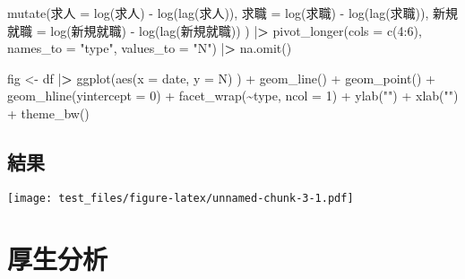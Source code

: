 \documentclass[
]{book}
\newenvironment{Shaded}{\begin{snugshade}}{\end{snugshade}}
\newcommand{\AttributeTok}[1]{\textcolor[rgb]{0.77,0.63,0.00}{#1}}
\newcommand{\DecValTok}[1]{\textcolor[rgb]{0.00,0.00,0.81}{#1}}
\newcommand{\ErrorTok}[1]{\textcolor[rgb]{0.64,0.00,0.00}{\textbf{#1}}}
\newcommand{\FunctionTok}[1]{\textcolor[rgb]{0.00,0.00,0.00}{#1}}
\newcommand{\NormalTok}[1]{#1}
\newcommand{\OtherTok}[1]{\textcolor[rgb]{0.56,0.35,0.01}{#1}}
\newcommand{\SpecialCharTok}[1]{\textcolor[rgb]{0.00,0.00,0.00}{#1}}
\newcommand{\StringTok}[1]{\textcolor[rgb]{0.31,0.60,0.02}{#1}}
\begin{document}
\begin{Shaded}
\begin{Highlighting}[]
  \FunctionTok{mutate}\NormalTok{(求人 }\OtherTok{=} \FunctionTok{log}\NormalTok{(求人) }\SpecialCharTok{{-}} \FunctionTok{log}\NormalTok{(}\FunctionTok{lag}\NormalTok{(求人)),}
\NormalTok{           求職 }\OtherTok{=} \FunctionTok{log}\NormalTok{(求職) }\SpecialCharTok{{-}} \FunctionTok{log}\NormalTok{(}\FunctionTok{lag}\NormalTok{(求職)),}
\NormalTok{           新規就職 }\OtherTok{=} \FunctionTok{log}\NormalTok{(新規就職) }\SpecialCharTok{{-}} \FunctionTok{log}\NormalTok{(}\FunctionTok{lag}\NormalTok{(新規就職))}
\NormalTok{           ) }\SpecialCharTok{|}\ErrorTok{\textgreater{}} 
  \FunctionTok{pivot\_longer}\NormalTok{(}\AttributeTok{cols =} \FunctionTok{c}\NormalTok{(}\DecValTok{4}\SpecialCharTok{:}\DecValTok{6}\NormalTok{),}
               \AttributeTok{names\_to =} \StringTok{"type"}\NormalTok{,}
               \AttributeTok{values\_to =} \StringTok{"N"}\NormalTok{) }\SpecialCharTok{|}\ErrorTok{\textgreater{}} 
  \FunctionTok{na.omit}\NormalTok{()}

\NormalTok{fig }\OtherTok{\textless{}{-}}
\NormalTok{  df }\SpecialCharTok{|}\ErrorTok{\textgreater{}} 
  \FunctionTok{ggplot}\NormalTok{(}\FunctionTok{aes}\NormalTok{(}\AttributeTok{x =}\NormalTok{ date,}
             \AttributeTok{y =}\NormalTok{ N)}
\NormalTok{         ) }\SpecialCharTok{+}
  \FunctionTok{geom\_line}\NormalTok{() }\SpecialCharTok{+}
  \FunctionTok{geom\_point}\NormalTok{() }\SpecialCharTok{+}
  \FunctionTok{geom\_hline}\NormalTok{(}\AttributeTok{yintercept =} \DecValTok{0}\NormalTok{) }\SpecialCharTok{+}
  \FunctionTok{facet\_wrap}\NormalTok{(}\SpecialCharTok{\textasciitilde{}}\NormalTok{type,}
             \AttributeTok{ncol =} \DecValTok{1}\NormalTok{) }\SpecialCharTok{+}
  \FunctionTok{ylab}\NormalTok{(}\StringTok{""}\NormalTok{) }\SpecialCharTok{+}
  \FunctionTok{xlab}\NormalTok{(}\StringTok{""}\NormalTok{) }\SpecialCharTok{+}
  \FunctionTok{theme\_bw}\NormalTok{()}
\end{Highlighting}
\end{Shaded}

\hypertarget{ux7d50ux679c}{%
\section{結果}\label{ux7d50ux679c}}

\texttt{[image: test\_files/figure-latex/unnamed-chunk-3-1.pdf]}

\hypertarget{ux539aux751fux5206ux6790}{%
\chapter{厚生分析}\label{ux539aux751fux5206ux6790}}
\end{document}

